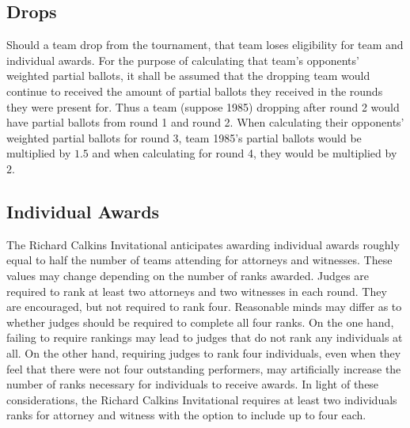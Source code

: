 \documentclass{article}
\begin{document}
\subsection{Drops}
Should a team drop from the tournament, that team loses eligibility for team and individual awards.  For the purpose of calculating that team's opponents' weighted partial ballots, it shall be assumed that the dropping team would continue to received the amount of partial ballots they received in the rounds they were present for.  Thus a team (suppose 1985) dropping after round 2 would have partial ballots from round 1 and round 2.  When calculating their opponents' weighted partial ballots for round 3, team 1985's partial ballots would be multiplied by $1.5$ and when calculating for round 4, they would be multiplied by $2$.
\subsection{Individual Awards}
The Richard Calkins Invitational anticipates awarding individual awards roughly equal to half the number of teams attending for attorneys and witnesses.  These values may change depending on the number of ranks awarded.  Judges are required to rank at least two attorneys and two witnesses in each round.  They are encouraged, but not required to rank four.  Reasonable minds may differ as to whether judges should be required to complete all four ranks.  On the one hand, failing to require rankings may lead to judges that do not rank any individuals at all.  On the other hand, requiring judges to rank four individuals, even when they feel that there were not four outstanding performers, may artificially increase the number of ranks necessary for individuals to receive awards.  In light of these considerations, the Richard Calkins Invitational requires at least two individuals ranks for attorney and witness with the option to include up to four each.
\end{document}

